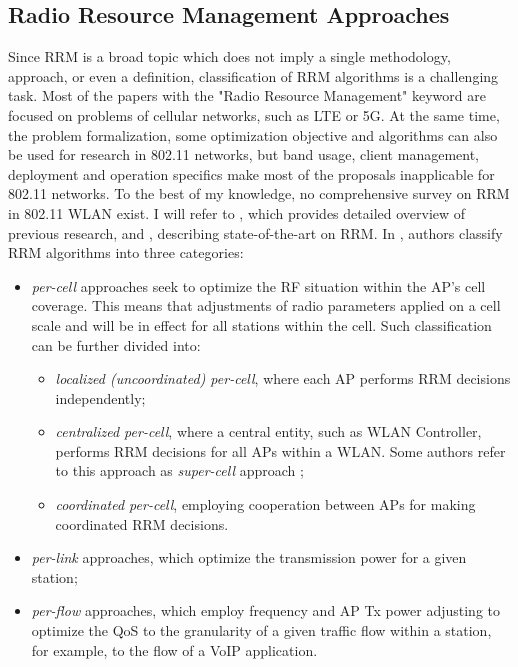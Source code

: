 \subsection {Radio Resource Management Approaches}
\label{chap:lr:sec:rrm_approaches}
Since RRM is a broad topic which does not imply a single methodology, approach, or even a definition, classification of RRM algorithms is a challenging task. Most of the papers with the "Radio Resource Management" keyword are focused on problems of cellular networks, such as LTE or 5G. At the same time, the problem formalization, some optimization objective and algorithms can also be used for research in 802.11 networks, but band usage, client management, deployment and operation specifics make most of the proposals inapplicable for 802.11 networks.
To the best of my knowledge, no comprehensive survey on RRM in 802.11 WLAN exist. I will refer to \cite{bouhafsPerFlowRadioResource2020}, which provides detailed overview of previous research, and \cite{leeDeepLearningAidedChannel2023}, describing state-of-the-art on RRM.
In \cite{bouhafsPerFlowRadioResource2020}, authors classify RRM algorithms into three categories:
\begin{itemize}
    \item \textit{per-cell} approaches seek to optimize the RF situation within the AP's cell coverage. This means that adjustments of radio parameters applied on a cell scale and will be in effect for all stations within the cell. Such classification can be further divided into:
    \begin{itemize}
        \item \textit{localized (uncoordinated) per-cell}, where each AP performs RRM decisions independently;
        \item \textit{centralized per-cell}, where a central entity, such as WLAN Controller, performs RRM decisions for all APs within a WLAN. Some authors refer to this approach as \textit{super-cell} approach \cite{levantiCAPWAPCompliantSolutionRadio2007}; \item \textit{coordinated per-cell}, employing cooperation between APs for making coordinated RRM decisions.  \end{itemize} \item \textit{per-link} approaches, which optimize the transmission power for a given station; \item \textit{per-flow} approaches, which employ frequency and AP Tx power adjusting to optimize the QoS to the granularity of a given traffic flow within a station, for example, to the flow of a VoIP application.
\end{itemize}


